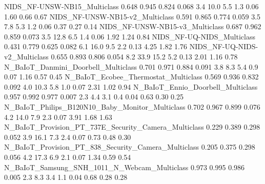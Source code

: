 NIDS_NF-UNSW-NB15_Multiclass                                             0.648      0.945       0.824      0.068          3.4         10.0           5.5          1.3         0.06         1.60          0.66         0.67
NIDS_NF-UNSW-NB15-v2_Multiclass                                          0.591      0.865       0.774      0.059          3.5          7.8           5.3          1.2         0.06         0.37          0.27         0.14
NIDS_NF-UNSW-NB15-v3_Multiclass                                          0.687      0.962       0.859      0.073          3.5         12.8           6.5          1.4         0.06         1.92          1.24         0.84
NIDS_NF-UQ-NIDS_Multiclass                                               0.431      0.779       0.625      0.082          6.1         16.0           9.5          2.2         0.13         4.25          1.82         1.76
NIDS_NF-UQ-NIDS-v2_Multiclass                                            0.655      0.893       0.806      0.054          8.2         33.9          15.2          5.2         0.13         2.01          1.16         0.78
N_BaIoT_Danmini_Doorbell_Multiclass                                      0.701      0.971       0.884      0.091          3.8          8.3           5.4          0.9         0.07         1.16          0.57         0.45
N_BaIoT_Ecobee_Thermostat_Multiclass                                     0.569      0.936       0.832      0.092          4.0         10.3           5.8          1.0         0.07         2.31          1.02         0.94
N_BaIoT_Ennio_Doorbell_Multiclass                                        0.957      0.992       0.977      0.007          2.3          4.4           3.1          0.4         0.04         0.63          0.30         0.25
N_BaIoT_Philips_B120N10_Baby_Monitor_Multiclass                          0.702      0.967       0.899      0.076          4.2         14.0           7.9          2.3         0.07         3.91          1.68         1.63
N_BaIoT_Provision_PT_737E_Security_Camera_Multiclass                     0.229      0.389       0.298      0.052          3.9         16.1           7.3          2.4         0.07         0.73          0.48         0.30
N_BaIoT_Provision_PT_838_Security_Camera_Multiclass                      0.205      0.375       0.298      0.056          4.2         17.3           6.9          2.1         0.07         1.34          0.59         0.54
N_BaIoT_Samsung_SNH_1011_N_Webcam_Multiclass                             0.973      0.995       0.986      0.005          2.3          8.3           3.4          1.1         0.04         0.68          0.28         0.28
